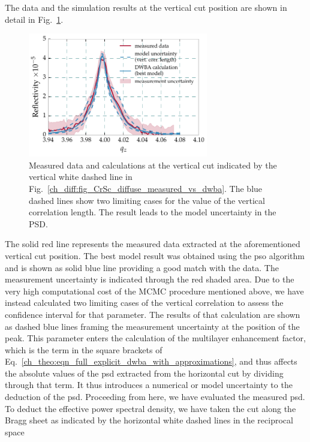 The data and the simulation results at the vertical cut position are shown in detail in Fig.~\ref{ch_diff:fig_CrSc_diffuse_vertical_correlation}.
\begin{figure}[htbp]
  \centering
  \includegraphics[width=0.7\textwidth]{img/CrSc_diffuse_vertical_correlation}
  \caption{Measured data and calculations at the vertical cut indicated by the vertical white dashed line in Fig.~\ref{ch_diff:fig_CrSc_diffuse_measured_vs_dwba}. The blue dashed lines show two limiting cases for the value of the vertical correlation length. The result leads to the model uncertainty in the PSD.}
  \label{ch_diff:fig_CrSc_diffuse_vertical_correlation}
\end{figure}
The solid red line represents the measured data extracted at the aforementioned vertical cut position. The best model result was obtained using the \gls{pso} algorithm and is shown as solid blue line providing a good match with the data. The measurement uncertainty is indicated through the red shaded area. Due to the very high computational cost of the MCMC procedure mentioned above, we have instead
calculated two limiting cases of the vertical correlation to assess the confidence interval for that parameter. The results of that calculation are shown as dashed blue lines framing the measurement uncertainty at the position of the peak. This parameter enters the calculation of the multilayer enhancement factor, which is the term in the square brackets of Eq.~\eqref{ch_theo:eqn_full_explicit_dwba_with_approximations}, and thus affects the absolute values of the \gls{psd} extracted from the horizontal cut by dividing through that term. It thus introduces a numerical or model uncertainty to the deduction of the \gls{psd}. Proceeding from here, we have evaluated the measured 
\gls{psd}. To deduct the effective power spectral density, we have taken the cut along the Bragg sheet as indicated by the horizontal white dashed lines in the reciprocal space 
